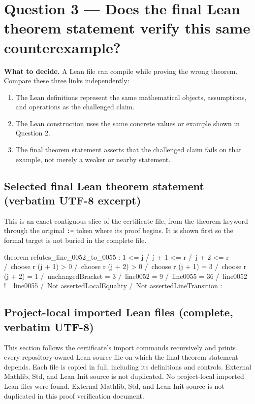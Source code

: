 \documentclass[11pt]{article}
\begin{document}
\section*{Question 3 --- Does the final Lean theorem statement verify this same counterexample?}
\textbf{What to decide.} A Lean file can compile while proving the wrong theorem. Compare these three links independently:
\begin{enumerate}
\item The Lean definitions represent the same mathematical objects, assumptions, and operations as the challenged claim.
\item The Lean construction uses the same concrete values or example shown in Question 2.
\item The final theorem statement asserts that the challenged claim fails on that example, not merely a weaker or nearby statement.
\end{enumerate}
\subsection*{Selected final Lean theorem statement (verbatim UTF-8 excerpt)}
This is an exact contiguous slice of the certificate file, from the theorem keyword through the original \texttt{:=} token where its proof begins. It is shown first so the formal target is not buried in the complete file.
\begin{Vlean}
theorem refutes_line_0052_to_0055 :
    1 <= j /\
    j + 1 <= r /\
    j + 2 <= r /\
    choose r (j + 1) > 0 /\
    choose r (j + 2) > 0 /\
    choose r (j + 1) = 3 /\
    choose r (j + 2) = 1 /\
    unchangedBracket = 3 /\
    line0052 = 9 /\
    line0055 = 36 /\
    line0052 != line0055 /\
    Not assertedLocalEquality /\
    Not assertedLineTransition :=
\end{Vlean}
\subsection*{Project-local imported Lean files (complete, verbatim UTF-8)}
This section follows the certificate's import commands recursively and prints every repository-owned Lean source file on which the final theorem statement depends. Each file is copied in full, including its definitions and controls. External Mathlib, Std, and Lean Init source is not duplicated.
No project-local imported Lean files were found. External Mathlib, Std, and Lean Init source is not duplicated in this proof verification document.
\end{document}
